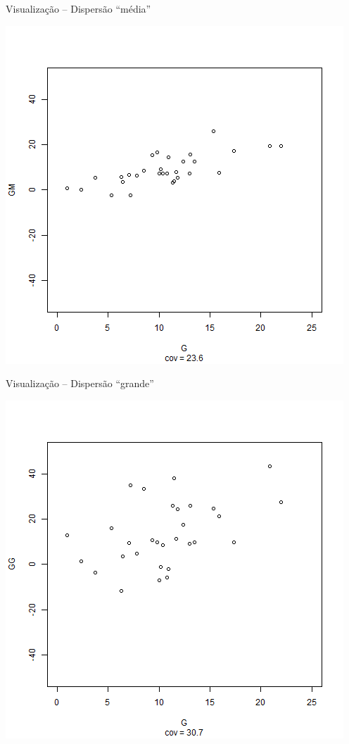 \documentclass{beamer}
\begin{document}
\begin{frame}{\scriptsize Visualização -- Dispersão ``média''}
  \begin{center}
    \includegraphics[height=.8\textheight]{Cap17/anim-2}
  \end{center}
\end{frame}

\begin{frame}{\scriptsize Visualização -- Dispersão ``grande''}
  \begin{center}
    \includegraphics[height=.8\textheight]{Cap17/anim-3}
  \end{center}
\end{frame}
\end{document}
